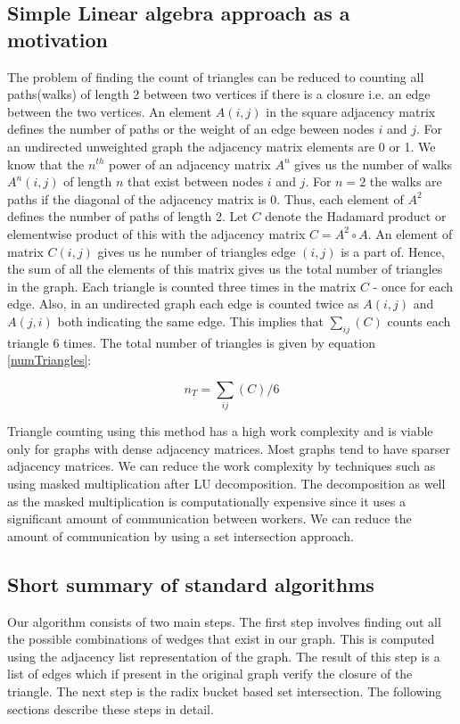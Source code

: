 \documentclass[conference]{IEEEtran}
\begin{document}
\subsection{Simple Linear algebra approach as a motivation}
The problem of finding the count of triangles can be reduced to counting all paths(walks) of length 2 between two vertices if there is a closure i.e. an edge between the two vertices. An element $A(i,j)$ in the square adjacency matrix defines the number of paths or the weight of an edge beween nodes $i$ and $j$. For an undirected unweighted graph the adjacency matrix elements are 0 or 1. We know that the $n^{th}$ power of an adjacency matrix $A^n$ gives us the number of walks $A^n(i,j)$ of length $n$ that exist between nodes $i$ and $j$. For $n=2$ the walks are paths if the diagonal of the adjacency matrix is 0. Thus, each element of $A^2$ defines the number of paths of length 2. Let $C$ denote the Hadamard product or elementwise product of this with the adjacency matrix $C=A^2\circ A$. An element of matrix $C(i,j)$ gives us he number of triangles edge $(i,j)$ is a part of. Hence, the sum of all the elements of this matrix gives us the total number of triangles in the graph. Each triangle is counted three times in the matrix $C$ - once for each edge. Also, in an undirected graph each edge is counted twice as $A(i,j)$ and $A(j,i)$ both indicating the same edge. This implies that $\sum_{ij}(C)$ counts each triangle $6$ times. The total number of triangles is given by equation \ref{numTriangles}:

\begin{equation}
 n_{T} = \sum_{ij}(C)/6 \label{numTriangles}
\end{equation}

Triangle counting using this method has a high work complexity and is viable only for graphs with dense adjacency matrices. Most graphs tend to have sparser adjacency matrices. We can reduce the work complexity by techniques such as using masked multiplication after LU decomposition\cite{b10}. The decomposition as well as the masked multiplication is computationally expensive since it uses a significant amount of communication between workers. We can reduce the amount of communication by using a set intersection approach.

\subsection{Short summary of standard algorithms}
Our algorithm consists of two main steps. The first step involves finding out all the possible combinations of wedges that exist in our graph. This is computed using the adjacency list representation of the graph. The result of this step is a list of edges which if present in the original graph verify the closure of the triangle. The next step is the radix bucket based set intersection. The following sections describe these steps in detail.
\end{document}
